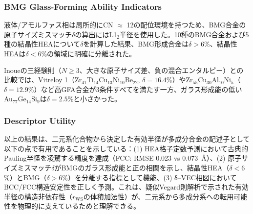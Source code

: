 \documentclass[a4paper,10pt,5p]{elsarticle}
\begin{document}
\subsubsection{BMG Glass-Forming Ability Indicators}

液体/アモルファス相は局所的にCN $\approx$ 12の配位環境を持つため、BMG合金の原子サイズミスマッチ$\delta$の算出にはL1$_2$半径を使用した。10種のBMG合金および5種の結晶性HEAについて$\delta$を計算した結果、BMG形成合金は$\delta > 6$\%、結晶性HEAは$\delta < 6$\%の領域に明確に分離された。

Inoueの三経験則（$N \geq 3$、大きな原子サイズ差、負の混合エンタルピー）との比較では、Vitreloy 1（Zr$_{41}$Ti$_{14}$Cu$_{13}$Ni$_{10}$Be$_{22}$, $\delta = 16.4$\%）やZr$_{55}$Cu$_{30}$Al$_{10}$Ni$_5$（$\delta = 12.9$\%）など高GFA合金が3条件すべてを満たす一方、ガラス形成能の低いAu$_{77}$Ge$_{14}$Si$_9$は$\delta = 2.5$\%と小さかった。

\subsubsection{Descriptor Utility}

以上の結果は、二元系化合物から決定した有効半径が多成分合金の記述子として以下の点で有用であることを示している：(1) HEA格子定数予測において古典的Pauling半径を凌駕する精度を達成（FCC: RMSE 0.023 vs 0.073~\AA）、(2) 原子サイズミスマッチ$\delta$がBMGのガラス形成能と正の相関を示し、結晶性HEA（$\delta < 6$\%）とBMG（$\delta > 6$\%）を分離する指標として機能、(3) δ--VEC相図においてBCC/FCC構造安定性を正しく予測。これは、疑似Vegard則解析で示された有効半径の構造非依存性（$r_\mathrm{WS}$の体積加法性）が、二元系から多成分系への転用可能性を物理的に支えているためと理解できる。


\end{document}
